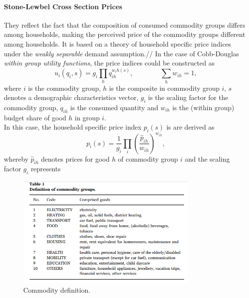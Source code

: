\paragraph{Stone-Lewbel Cross Section Prices\\}{They reflect the fact that the composition of consumed commodity groups differs among households, making the perceived price of the commodity groups different among households. It is based on a theory of household specific price indices under the \textit{weakly separable} demand assumption.//
	In the case of Cobb-Douglas \textit{within group utility functions}, the price indices could be constructed as
	\begin{equation}\label{eq2.5a}
		u_i(q_i, s)=g_i \prod_h q_{ih}^{w_ih(s)},   \qquad \qquad \sum_{h}w_{ih} = 1,
	\end{equation}
where $i$ is the commodity group, $h$ is the composite in commodity group $i$, $s$ denotes a demographic characteristics vector, $g_i$ is the scaling factor for the commodity group, $q_{ih}$ is the consumed quantity and $w_{ih}$ is the (within group) budget share of good $h$ in group $i$. \\
	In this case, the household specific price index $p_i(s)$ is are derived as
	\begin{equation}\label{eq2.5b}
		p_i(s)=\frac{1}{g_i} \prod_{i} (\frac{\hat{p}_{ih}}{w_{ih}})^{w_{ih}},
	\end{equation}
whereby $\hat{p}_{ih}$ denotes prices for good $h$ of commodity group $i$ and the scaling factor $g_i$ represents



}


\begin{figure}[h]  %
	\centering
	\includegraphics[width=0.8\textwidth]{./figure/ch2/fig2.1_table1.png}
	\caption{Commodity definition.}\label{fig2.1}
\end{figure}

